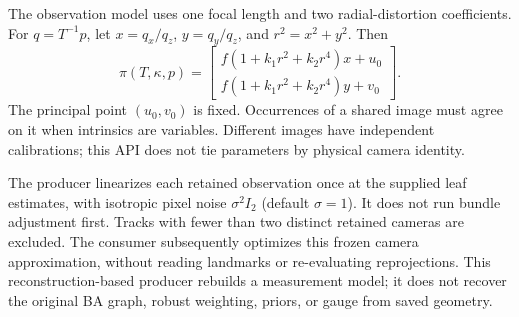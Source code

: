\documentclass[11pt,letterpaper]{article}
\begin{document}
The observation model uses one focal length and two radial-distortion coefficients.
For $q=T^{-1}p$, let $x=q_x/q_z$, $y=q_y/q_z$, and $r^2=x^2+y^2$. Then
\begin{equation}
 \pi(T,\kappa,p)=
 \begin{bmatrix} f(1+k_1r^2+k_2r^4)x+u_0\\
                 f(1+k_1r^2+k_2r^4)y+v_0\end{bmatrix}.
\end{equation}
The principal point $(u_0,v_0)$ is fixed. Occurrences of a shared image must agree
on it when intrinsics are variables. Different images have independent
calibrations; this API does not tie parameters by physical camera identity.

The producer linearizes each retained observation once at the supplied leaf
estimates, with isotropic pixel noise $\sigma^2 I_2$ (default $\sigma=1$).
It does not run bundle adjustment first. Tracks with fewer than two distinct
retained cameras are excluded. The consumer subsequently optimizes this frozen
camera approximation, without reading landmarks or re-evaluating reprojections.
This reconstruction-based producer rebuilds a measurement model; it does not
recover the original BA graph, robust weighting, priors, or gauge from saved geometry.

\newpage
\end{document}
